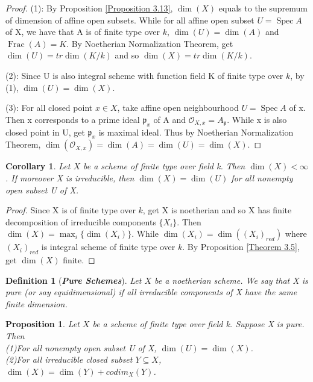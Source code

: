 \documentclass{ctexart}
\newtheorem{definition}{Definition}[section]
\newtheorem{proposition}{Proposition}[section]
\newtheorem{corollary}{Corollary}[section]
\newcommand{\spec}{\operatorname{Spec}}
\newcommand{\fraction}{\operatorname{Frac}}
\begin{document}
\begin{proof}
    (1): By Proposition \ref{Proposition 3.13}, $\dim(X)$ equals to the supremum of dimension of affine open subsets.
    While for all affine open subset $U = \spec A$ of X, we have that A is of finite type over $k$, $\dim(U) = \dim(A)$ and $\fraction(A) = K$.
    By Noetherian Normalization Theorem, get $\dim(U) = tr\dim(K/k)$ and so $\dim(X) = tr\dim(K/k)$.
    \par
    (2): Since U is also integral scheme with function field K of finite type over $k$, by (1), $\dim(U) = \dim(X)$. 
    \par
    (3): For all closed point $x\in X$, take affine open neighbourhood $U = \spec A$ of x.
    Then x corresponds to a prime ideal $\mathfrak{p}_{x}$ of A and $\mathcal{O}_{X, x} = A_{\mathfrak{p}}$.
    While x is also closed point in U, get $\mathfrak{p}_{x}$ is maximal ideal.
    Thus by Noetherian Normalization Theorem, $\dim(\mathcal{O}_{X, x}) = \dim(A) = \dim(U) = \dim(X)$. 
\end{proof}
\begin{corollary}
    Let $X$ be a scheme of finite type over field k. 
    Then $\dim(X) < \infty$.
    If moreover X is irreducible, then $\dim(X) = \dim(U)$ for all nonempty open subset U of X.
    \label{Corollary 3.1}
\end{corollary}
\begin{proof}
    Since X is of finite type over $k$, get X is noetherian and so X has finite decomposition of irreducible components $\{X_{i}\}$.
    Then $\dim(X) = \max_{i}\{\dim(X_{i})\}$.
    While $\dim(X_{i}) = \dim((X_{i})_{red})$ where $(X_{i})_{red}$ is integral scheme of finite type over $k$.
    By Proposition \ref{Theorem 3.5}, get $\dim(X)$ finite.
\end{proof}
\begin{definition}[\textbf{\emph{Pure Schemes}}]
    Let $X$ be a noetherian scheme.
    We say that X is pure (or say equidimensional) if all irreducible components of X have the same finite dimension.
\end{definition}
\begin{proposition}
    Let $X$ be a scheme of finite type over field k.
    Suppose X is pure.
    Then \\
    (1)For all nonempty open subset U of X, $\dim(U) = \dim(X)$. \\
    (2)For all irreducible closed subset $Y \subseteq X$, $\dim(X) = \dim(Y) + codim_{X}(Y)$. 
    \label{Proposition 3.14} 
\end{proposition}
\end{document}
